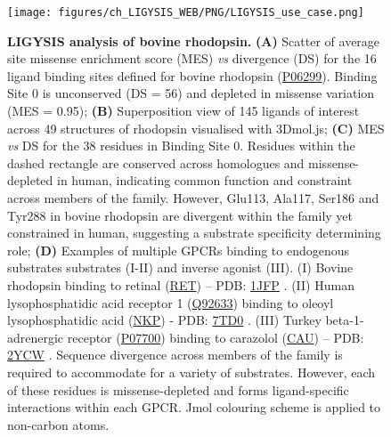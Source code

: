 \begin{figure}[htbp!]
    \centering
    \texttt{[image: figures/ch\_LIGYSIS\_WEB/PNG/LIGYSIS\_use\_case.png]}
    \caption[LIGYSIS analysis of bovine rhodopsin]{\textbf{LIGYSIS analysis of bovine rhodopsin.} \textbf{(A)} Scatter of average site missense enrichment score (MES) \textit{vs}  divergence (DS) for the 16 ligand binding sites defined for bovine rhodopsin (\href{https://www.uniprot.org/uniprotkb/P06299/entry}{P06299}). Binding Site 0 is unconserved (DS = 56) and depleted in missense variation (MES = 0.95); \textbf{(B)} Superposition view of 145 ligands of interest across 49 structures of rhodopsin visualised with 3Dmol.js; \textbf{(C)} MES \textit{vs} DS for the 38 residues in Binding Site 0. Residues within the dashed rectangle are conserved across homologues and missense-depleted in human, indicating common function and constraint across members of the family. However, Glu113, Ala117, Ser186 and Tyr288 in bovine rhodopsin are divergent within the family yet constrained in human, suggesting a substrate specificity determining role; \textbf{(D)} Examples of multiple GPCRs binding to endogenous substrates substrates (I-II) and inverse agonist (III). (I) Bovine rhodopsin binding to retinal (\href{https://www.ebi.ac.uk/pdbe-srv/pdbechem/chemicalCompound/show/RET}{RET}) – PDB: \href{https://www.ebi.ac.uk/pdbe/entry/pdb/1jfp}{1JFP} \cite{YEAGLE_2001_GPCRs}. (II) Human lysophosphatidic acid receptor 1 (\href{https://www.uniprot.org/uniprotkb/Q92633/entry}{Q92633}) binding to oleoyl lysophosphatidic acid (\href{https://www.ebi.ac.uk/pdbe-srv/pdbechem/chemicalCompound/show/NKP}{NKP}) - PDB: \href{https://www.ebi.ac.uk/pdbe/entry/pdb/7TD0}{7TD0} \cite{LIU_2022_GPCRs}. (III) Turkey beta-1-adrenergic receptor (\href{https://www.uniprot.org/uniprotkb/P07700/entry}{P07700}) binding to carazolol (\href{https://www.ebi.ac.uk/pdbe-srv/pdbechem/chemicalCompound/show/CAU}{CAU}) – PDB: \href{https://www.ebi.ac.uk/pdbe/entry/pdb/2YCW}{2YCW} \cite{MOUKHAMETZIANOV_2011_GPCRs}. Sequence divergence across members of the family is required to accommodate for a variety of substrates. However, each of these residues is missense-depleted and forms ligand-specific interactions within each GPCR. Jmol colouring scheme \cite{JMOL} is applied to non-carbon atoms.}
    \label{fig:ligysis_rhodopsin}
\end{figure}

